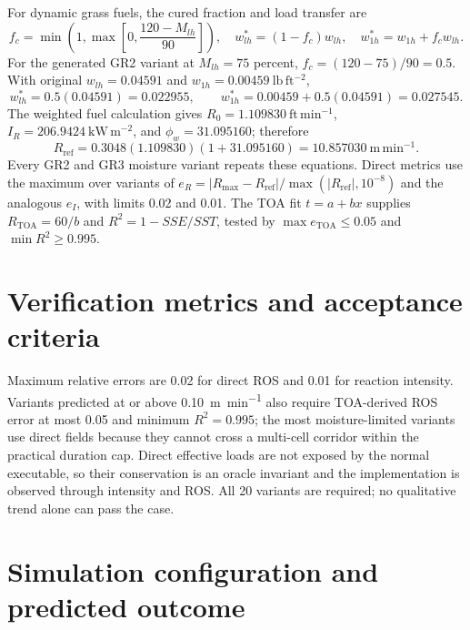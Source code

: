 For dynamic grass fuels, the cured fraction and load transfer are
\[
 f_c=\min\!\left(1,\max\!\left[0,\frac{120-M_{lh}}{90}\right]\right),
 \quad w_{lh}^{*}=(1-f_c)w_{lh},\quad
 w_{1h}^{*}=w_{1h}+f_cw_{lh}.
\]
For the generated GR2 variant at \(M_{lh}=75\) percent,
\(f_c=(120-75)/90=0.5\).  With original
\(w_{lh}=0.04591\) and \(w_{1h}=0.00459~\mathrm{lb\,ft^{-2}}\),
\[
 w_{lh}^{*}=0.5(0.04591)=0.022955,\qquad
 w_{1h}^{*}=0.00459+0.5(0.04591)=0.027545.
\]
The weighted fuel calculation gives
\(R_0=1.109830~\mathrm{ft\,min^{-1}}\),
\(I_R=206.9424~\mathrm{kW\,m^{-2}}\), and
\(\phi_w=31.095160\); therefore
\[
 R_{\mathrm{ref}}=0.3048(1.109830)(1+31.095160)
 =10.857030~\mathrm{m\,min^{-1}}.
\]
Every GR2 and GR3 moisture variant repeats these equations.  Direct
metrics use the maximum over variants of
\(e_R=|R_{\max}-R_{\mathrm{ref}}|/
\max(|R_{\mathrm{ref}}|,10^{-8})\) and the analogous \(e_I\), with limits
0.02 and 0.01.  The TOA fit \(t=a+bx\) supplies
\(R_{\mathrm{TOA}}=60/b\) and \(R^2=1-SSE/SST\), tested by
\(\max e_{\mathrm{TOA}}\leq0.05\) and \(\min R^2\geq0.995\).

\section{Verification metrics and acceptance criteria}
Maximum relative errors are 0.02 for direct ROS and 0.01 for reaction intensity.  Variants predicted at or above \SI{0.10}{m.min^{-1}} also require TOA-derived ROS error at most 0.05 and minimum $R^2=0.995$; the most moisture-limited variants use direct fields because they cannot cross a multi-cell corridor within the practical duration cap.  Direct effective loads are not exposed by the normal executable, so their conservation is an oracle invariant and the implementation is observed through intensity and ROS.  All 20 variants are required; no qualitative trend alone can pass the case.

\section{Simulation configuration and predicted outcome}

